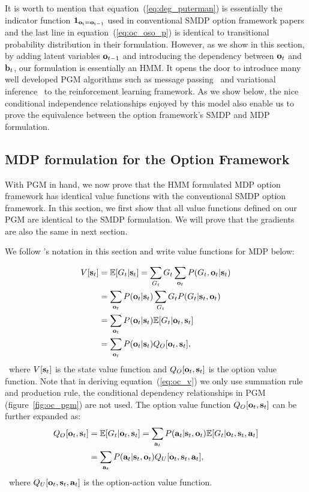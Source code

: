 It is worth to mention that equation~(\ref{eq:deg_puterman}) is
essentially the indicator function
$\bm{1}_\mathrm{{\mathbf{o}}_t={\mathbf{o}}_{t-1}}$ used in conventional SMDP option
framework papers and the last line in
equation~(\ref{eq:oc_oso_p}) is identical to transitional
probability distribution in their formulation. However, as we
show in this section, by adding latent variables ${\mathbf{o}}_{t-1}$ and
introducing the dependency between ${\mathbf{o}}_{t}$ and ${\mathbf{b}}_t$, our
formulation is essentially an HMM. It
opens the door to introduce many well developed PGM algorithms
such as message passing~\cite{forney1973viterbi} and variational
inference~\cite{hoffman2013stochastic} to the reinforcement
learning framework. As we show below, the nice conditional
independence relationships enjoyed by this model also enable us
to prove the equivalence between the option framework's SMDP and
MDP formulation.

\subsection{MDP formulation for the Option Framework}
\label{sec:appen_mdp}

With PGM in hand, we now prove that the HMM formulated MDP option
framework has identical value functions with the conventional
SMDP option framework\cite{bacon2017option,sutton1999between}. In
this section, we first show that all value functions defined on
our PGM are identical to the SMDP formulation. We will prove that
the gradients are also the same in next section.

We follow 's notation in this
section and write value functions for MDP below:

\begin{align}
  \label{eq:oc_v}
  \nonumber  V[{\mathbf{s}}_t] &= \mathbb{E}[G_t|{\mathbf{s}}_t] = \sum_{G_t}G_t\sum_{{\mathbf{o}}_t}P(G_t,{\mathbf{o}}_t|{\mathbf{s}}_t)\\
  \nonumber  &= \sum_{{\mathbf{o}}_t}P({\mathbf{o}}_t|{\mathbf{s}}_t)\sum_{G_t}G_tP(G_t|{\mathbf{s}}_t, {\mathbf{o}}_t)\\
  \nonumber  &= \sum_{{\mathbf{o}}_t}P({\mathbf{o}}_t|{\mathbf{s}}_t)\mathbb{E}[G_t|{\mathbf{o}}_t, {\mathbf{s}}_t]\\
  &=\sum_{{\mathbf{o}}_t}P({\mathbf{o}}_t|{\mathbf{s}}_t)Q_{O}[{\mathbf{o}}_t,{\mathbf{s}}_t],
\end{align}
~where $V[{\mathbf{s}}_t]$ is the state value
function\cite{sutton2018reinforcement} and $Q_O[{\mathbf{o}}_t,{\mathbf{s}}_t]$
is the option value
function\cite{bacon2017option,sutton1999between}. Note that in
deriving equation~(\ref{eq:oc_v}) we only use summation rule and
production rule, the conditional dependency relationships in PGM
(figure~\ref{fig:oc_pgm}) are not used. The option value function
$Q_O[{\mathbf{o}}_t,{\mathbf{s}}_t]$ can be further expanded as:
\begin{align}
  \label{eq:oc_qos}
  \nonumber  Q_O[{\mathbf{o}}_t,{\mathbf{s}}_t] &= \mathbb{E}[G_t|{\mathbf{o}}_t, {\mathbf{s}}_t] = \sum_{{\mathbf{a}}_t}P({\mathbf{a}}_t|{\mathbf{s}}_t,{\mathbf{o}}_t)\mathbb{E}[G_t|{\mathbf{o}}_t, {\mathbf{s}}_t,{\mathbf{a}}_t]\\
&= \sum_{{\mathbf{a}}_t}P({\mathbf{a}}_t|{\mathbf{s}}_t,{\mathbf{o}}_t)Q_U[{\mathbf{o}}_t, {\mathbf{s}}_t,{\mathbf{a}}_t],
\end{align}
~where $Q_U[{\mathbf{o}}_t, {\mathbf{s}}_t,{\mathbf{a}}_t]$ is the option-action value
function.

